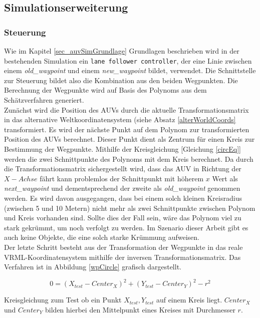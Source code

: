 \subsection{Simulationserweiterung}
\subsubsection{Steuerung}
\label{sec_waypoint}
Wie im Kapitel \ref{sec_auvSimGrundlage} Grundlagen beschrieben wird in der bestehenden Simulation ein \texttt{lane follower controller}, der eine Linie zwischen einem \textit{old\_waypoint} und einem \textit{new\_waypoint} bildet, verwendet.
Die Schnittstelle zur Steuerung bildet also die Kombination aus den beiden Wegpunkten. Die Berechnung der Wegpunkte wird auf Basis des Polynoms aus dem Schätzverfahren generiert.\\
Zunächst wird die Position des AUVs durch die aktuelle Transformationsmatrix in das alternative Weltkoordinatensystem (siehe Absatz \ref{alterWorldCoords} transformiert. Es wird der nächste Punkt auf dem Polynom zur transformierten Position des AUVs berechnet. Dieser Punkt dient als Zentrum für einen Kreis zur Bestimmung der Wegpunkte. Mithilfe der Kreisgleichung [Gleichung \ref{circEq}] werden die zwei Schnittpunkte des Polynoms mit dem Kreis berechnet. Da durch die Transformationsmatrix sichergestellt wird, dass das AUV in Richtung der $X-Achse$ fährt kann problemlos der Schnittpunkt mit höherem $x$ Wert als \textit{next\_waypoint} und dementsprechend der zweite als \textit{old\_waypoint} genommen werden. Es wird davon ausgegangen, dass bei einem solch kleinen Kreisradius (zwischen 5 und 10 Metern) nicht mehr als zwei Schnittpunkte zwischen Polynom und Kreis vorhanden sind. Sollte dies der Fall sein, wäre das Polynom viel zu stark gekrümmt, um noch verfolgt zu werden. Im Szenario dieser Arbeit gibt es auch keine Objekte, die eine solch starke Krümmung aufweisen.\\
Der letzte Schritt besteht aus der Transformation der Wegpunkte in das reale VRML-Koordinatensystem mithilfe der inversen Transformationsmatrix.
Das Verfahren ist in Abbildung \ref{wpCircle} grafisch dargestellt.

\begin{ownequation}[H]
\begin{equation}
0 = (X_{test}-Center_X)^2+(Y_{test}-Center_Y)^2 - r^2
\end{equation}
\caption[Kreisgleichung zum Test ob ein Punkt auf einem Kreis liegt.]{Kreisgleichung zum Test ob ein Punkt $X_{test},Y_{test}$ auf einem Kreis liegt. $Center_X$ und $Center_Y$ bilden hierbei den Mittelpunkt eines Kreises mit Durchmesser $r$.}
\label{circEq}
\end{ownequation}

